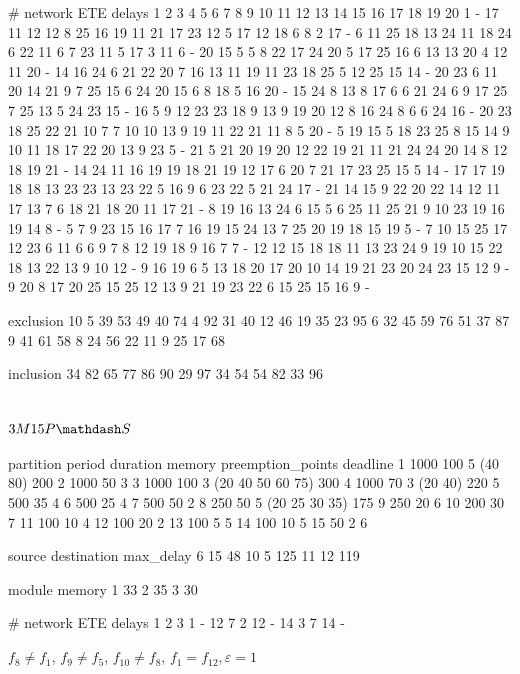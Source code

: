 # network ETE delays
    1   2   3   4   5   6   7   8   9   10  11  12  13  14  15  16  17  18  19  20
1   -   17  11  12  12  8   25  16  19  11  21  17  23  12  5   17  12  18  6   8
2   17  -   6   11  25  18  13  24  11  18  24  6   22  11  6   7   23  11  5   17
3   11  6   -   20  15  5   5   8   22  17  24  20  5   17  25  16  6   13  13  20
4   12  11  20  -   14  16  24  6   21  22  20  7   16  13  11  19  11  23  18  25
5   12  25  15  14  -   20  23  6   11  20  14  21  9   7   25  15  6   24  20  15
6   8   18  5   16  20  -   15  24  8   13  8   17  6   6   21  24  6   9   17  25
7   25  13  5   24  23  15  -   16  5   9   12  23  23  18  9   13  9   19  20  12
8   16  24  8   6   6   24  16  -   20  23  18  25  22  21  10  7   7   10  10  13
9   19  11  22  21  11  8   5   20  -   5   19  15  5   18  23  25  8   15  14  9
10  11  18  17  22  20  13  9   23  5   -   21  5   21  20  19  20  12  22  19  21
11  21  24  24  20  14  8   12  18  19  21  -   14  24  11  16  19  19  18  21  19
12  17  6   20  7   21  17  23  25  15  5   14  -   17  17  19  18  18  13  23  23
13  23  22  5   16  9   6   23  22  5   21  24  17  -   21  14  15  9   22  20  22
14  12  11  17  13  7   6   18  21  18  20  11  17  21  -   8   19  16  13  24  6
15  5   6   25  11  25  21  9   10  23  19  16  19  14  8   -   5   7   9   23  15
16  17  7   16  19  15  24  13  7   25  20  19  18  15  19  5   -   7   10  15  25
17  12  23  6   11  6   6   9   7   8   12  19  18  9   16  7   7   -   12  12  15
18  18  11  13  23  24  9   19  10  15  22  18  13  22  13  9   10  12  -   9   16
19  6   5   13  18  20  17  20  10  14  19  21  23  20  24  23  15  12  9   -   9
20  8   17  20  25  15  25  12  13  9   21  19  23  22  6   15  25  15  16  9   -

exclusion
10 5
39 53
49 40
74 4
92 31
40 12
46 19
35 23
95 6
32 45
59 76
51 37
87 9
41 61
58 8
24 56
22 11
9  25
17 68

inclusion
34 82
65 77
86 90
29 97
34 54
54 82
33 96


\section{\texorpdfstring{$3M15P\mathdash S$}{3M15PS}}

partition period duration memory preemption_points deadline
1         1000   100      5      (40 80)           200
2         1000   50       3
3         1000   100      3      (20 40 50 60 75)  300
4         1000   70       3      (20 40)           220
5         500    35       4
6         500    25       4
7         500    50       2
8         250    50       5      (20 25 30 35)     175
9         250    20       6
10        200    30       7
11        100    10       4
12        100    20       2
13        100    5        5
14        100    10       5
15        50     2        6

source destination max_delay
6      15          48
10     5           125
11     12          119

module memory
1      33
2      35
3      30

# network ETE delays
  1  2  3
1 -  12 7
2 12 -  14
3 7  14 -

$f_{8} ≠ f_{1}$, $f_{9} ≠ f_{5}$, $f_{10} ≠ f_{8}$, $f_{1} = f_{12}, ε=1$
